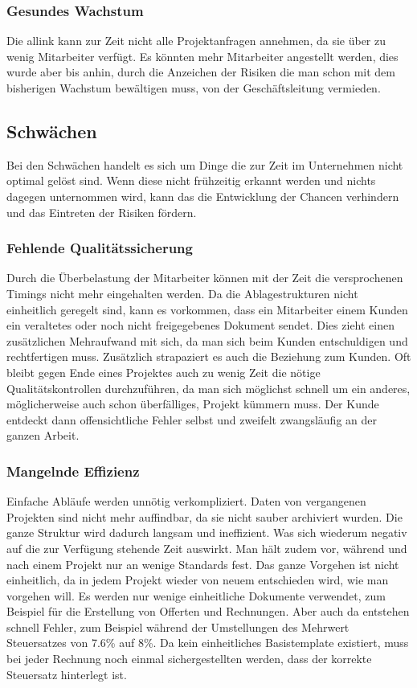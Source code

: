 \subsubsection{Gesundes Wachstum}
Die allink kann zur Zeit nicht alle Projektanfragen annehmen, da sie über zu
wenig Mitarbeiter verfügt. Es könnten mehr Mitarbeiter angestellt werden, dies
wurde aber bis anhin, durch die Anzeichen der Risiken die man schon mit dem bisherigen
Wachstum bewältigen muss, von der Geschäftsleitung vermieden.

\subsection{Schwächen}
Bei den Schwächen handelt es sich um Dinge die zur Zeit im Unternehmen nicht
optimal gelöst sind. Wenn diese nicht frühzeitig erkannt werden und nichts
dagegen unternommen wird, kann das die Entwicklung der Chancen verhindern und
das Eintreten der Risiken fördern.

\subsubsection{Fehlende Qualitätssicherung}
Durch die Überbelastung der Mitarbeiter können mit der Zeit die versprochenen Timings
nicht mehr eingehalten werden. Da die Ablagestrukturen nicht einheitlich geregelt
sind, kann es vorkommen, dass ein Mitarbeiter einem Kunden ein veraltetes oder
noch nicht freigegebenes Dokument sendet. Dies zieht einen zusätzlichen 
Mehraufwand mit sich, da man sich beim Kunden entschuldigen und rechtfertigen
muss. Zusätzlich strapaziert es auch die Beziehung zum Kunden.
Oft bleibt gegen Ende eines Projektes auch zu wenig Zeit die nötige 
Qualitätskontrollen durchzuführen, da man sich möglichst schnell um ein anderes,
möglicherweise auch schon überfälliges, Projekt kümmern muss. Der Kunde entdeckt
dann offensichtliche Fehler selbst und zweifelt zwangsläufig an der ganzen Arbeit.

\subsubsection{Mangelnde Effizienz}
Einfache Abläufe werden unnötig verkompliziert. Daten von vergangenen Projekten 
sind nicht mehr auffindbar, da sie nicht sauber archiviert wurden. Die ganze
Struktur wird dadurch langsam und ineffizient. Was sich wiederum negativ auf die zur
Verfügung stehende Zeit auswirkt.
Man hält zudem vor, während und nach einem Projekt nur an wenige Standards fest. 
Das ganze Vorgehen ist nicht einheitlich, da in jedem Projekt wieder von
neuem entschieden wird, wie man vorgehen will. Es werden nur wenige einheitliche
Dokumente verwendet, zum Beispiel für die Erstellung von Offerten und Rechnungen.
Aber auch da entstehen schnell Fehler, zum Beispiel während der Umstellungen des 
Mehrwert Steuersatzes von 7.6\% auf 8\%. Da kein einheitliches Basistemplate
existiert, muss bei jeder Rechnung noch einmal sichergestellten werden, dass
der korrekte Steuersatz hinterlegt ist.

